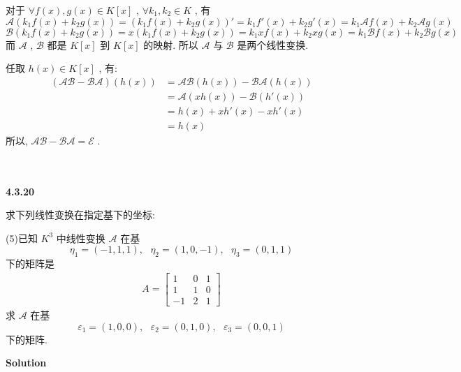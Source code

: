 \documentclass[11pt,a4paper,openany,oneside]{book}
\newcommand\Solution{\noindent\textbf{\textsf{Solution}}\par\medskip}
\begin{document}
对于 $ \forall f(x), g(x) \in K[x] $ ,  $ \forall k_1, k_2 \in K $ , 有
 $$  \mathcal{A}(k_1f(x) + k_2g(x)) =(k_1f(x) + k_2g(x))' =  k_1f'(x) + k_2g'(x) = k_1\mathcal{A}f(x) + k_2\mathcal{A}g(x)  $$ 
 $$  \mathcal{B}(k_1f(x) + k_2g(x)) =x(k_1f(x) + k_2g(x)) = k_1xf(x) + k_2xg(x) = k_1\mathcal{B}f(x) + k_2\mathcal{B}g(x)  $$ 
而 $ \mathcal{A} $ ,  $ \mathcal{B} $ 都是 $ K[x] $ 到 $ K[x] $ 的映射. 
所以 $ \mathcal{A} $ 与 $ \mathcal{B} $ 是两个线性变换. 

任取 $ h(x) \in K[x] $ , 有:
\begin{align*}
(\mathcal{AB} - \mathcal{BA})(h(x)) &= \mathcal{A}\mathcal{B}(h(x)) - \mathcal{B}\mathcal{A}(h(x)) \\
&= \mathcal{A}(xh(x)) - \mathcal{B}(h'(x))  \\
&=h(x) + xh'(x) - xh'(x) \\
&=h(x)
\end{align*}
所以,  $ \mathcal{A}\mathcal{B} - \mathcal{B}\mathcal{A} = \mathcal{E} $ .  \\  \\  \\



\begin{myexample}
	\textbf{4.3.20}

求下列线性变换在指定基下的坐标:

(5)已知 $ K^3 $ 中线性变换 $ \mathcal{A} $ 在基
 $$  \eta_1=(-1, 1, 1), \ \ \ \eta_2=(1, 0, -1), \ \ \ \eta_3=(0, 1, 1)  $$ 
下的矩阵是
\begin{gather*}
A=
\begin{bmatrix}
1  &  0  &  1  \\
1  &  1  &  0  \\
-1  &  2  &  1  
\end{bmatrix}
\end{gather*}
求 $ \mathcal{A} $ 在基
 $$  \varepsilon_1=(1,0,0), \ \ \ \varepsilon_2=(0, 1, 0), \ \ \ \varepsilon_3=(0, 0, 1)  $$ 
下的矩阵.  \\ 

\end{myexample}
\Solution
\end{document}
